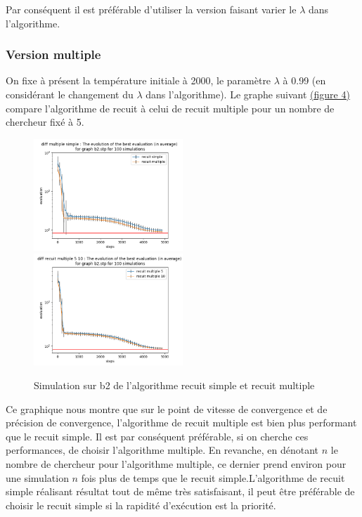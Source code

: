 \documentclass[11pt,french]{report}
\begin{document}
        Par conséquent il est préférable d'utiliser la version faisant varier le $\lambda$ dans l'algorithme.

        \subsubsection{Version multiple}
        On fixe à présent la température initiale à 2000, le paramètre $\lambda$ à 0.99 (en considérant le changement du $\lambda$ dans l'algorithme).
        Le graphe suivant \hyperref[Figure4]{(figure 4)} compare l'algorithme de recuit à celui de recuit multiple pour un nombre de chercheur fixé à 5.
        \begin{figure}
          \includegraphics[width=0.5\textwidth]{best_b2_evaluation_diff multiple simple.png}
          \includegraphics[width=0.5\textwidth]{best_b2_evaluation_diff recuit multiple 5 10.png}
          \caption{Simulation sur b2 de l'algorithme recuit simple et recuit multiple}
          \label{Figure4}
        \end{figure}

        Ce graphique nous montre que sur le point de vitesse de convergence et de précision de convergence, l'algorithme de recuit multiple est bien plus performant que le recuit simple. Il est par conséquent préférable, si on cherche ces performances, de choisir l'algorithme multiple. En revanche, en dénotant $n$ le nombre de chercheur pour l'algorithme multiple, ce dernier prend environ pour une simulation $n$ fois plus de temps que le recuit simple.L'algorithme de recuit simple réalisant résultat tout de même très satisfaisant, il peut être préférable de choisir le recuit simple si la rapidité d'exécution est la priorité.
\end{document}
